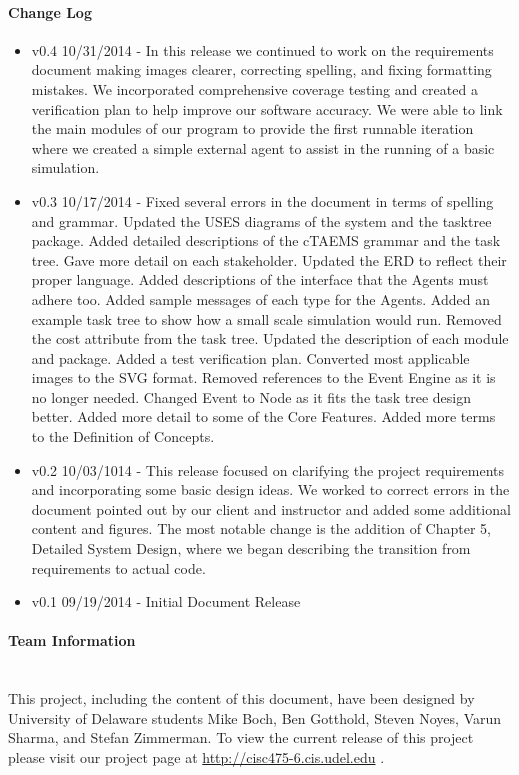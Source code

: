 \paragraph{Change Log}
\begin{itemize}
\item v0.4 10/31/2014 - In this release we continued to work on the requirements
document making images clearer, correcting spelling, and fixing formatting mistakes. We incorporated comprehensive coverage testing and created a verification plan to help improve our software accuracy. We were able to link the main modules of our program to provide the first runnable iteration where we created a simple external agent to assist in the running of a basic simulation. 
\item v0.3 10/17/2014 - Fixed several errors in the document in terms
of spelling and grammar. Updated the USES diagrams of the system and the tasktree package. Added detailed descriptions of the cTAEMS grammar and the task tree. Gave more detail on each stakeholder. Updated the ERD to reflect their proper language. Added descriptions of the interface that the Agents must adhere too. Added sample messages of each type for the Agents. Added an example task tree to show how a small scale simulation would run. Removed the cost attribute from the task tree. Updated the description of each module and package. Added a test verification plan. Converted most applicable images to the SVG format. Removed references to the Event Engine as it is no longer needed. Changed Event to Node as it fits the task tree design better. Added more detail to some of the Core Features. Added more terms to the Definition of Concepts.
\item v0.2 10/03/1014 - This release focused on clarifying the project
requirements and incorporating some basic design ideas. We worked to correct errors in the document pointed out by our client and instructor and added some additional content and figures. The most notable change is the addition of Chapter 5, Detailed System Design, where we began describing the transition from requirements to actual code.
\item v0.1 09/19/2014 - Initial Document Release
\end{itemize}


\paragraph{Team Information  \\ \\} 

This project, including the content of this document, have been designed by University of Delaware students Mike Boch, Ben Gotthold, Steven Noyes, Varun Sharma, and Stefan Zimmerman. To view the current release of this project please visit our project page at \color{black}\url{http://cisc475-6.cis.udel.edu}
.
